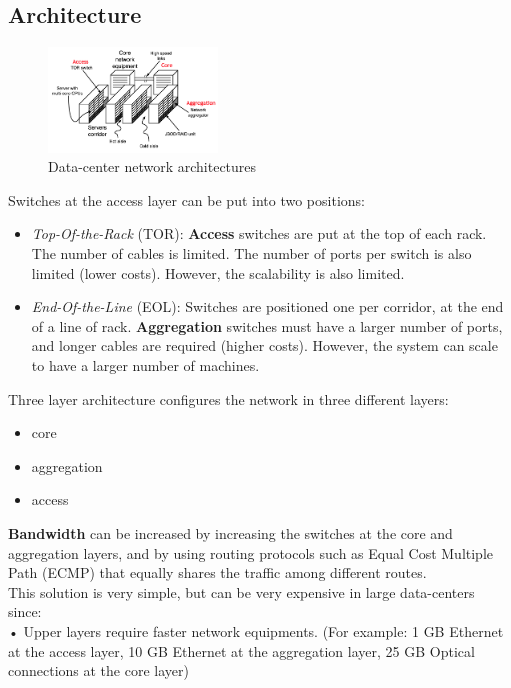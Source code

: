 \documentclass[10pt, oneside]{article}
\begin{document}
\subsection{Architecture}
\begin{figure}[H]
    \begin{center}
    \includegraphics[width=0.4\textwidth]{img/img22.png}
    \caption{Data-center network architectures}
    \label{fig:DS net architecture}
    \end{center}
\end{figure}
Switches at the access layer can be put into two positions:
\begin{itemize}
    \item {\sl Top-Of-the-Rack} (TOR): {\bf Access} switches are put at the top of each rack. The number of cables is limited. The number of ports per switch is also limited (lower costs). However, the scalability is also limited.
    \item {\sl End-Of-the-Line} (EOL): Switches are positioned one per corridor, at the end of a line of rack. {\bf Aggregation} switches must have a larger number of ports, and longer cables are required (higher costs). However, the system can scale to have a larger number of machines.
\end{itemize}
Three layer architecture configures the network in three different
layers:
\begin{itemize}
    \item core
    \item aggregation
    \item access
\end{itemize}
{\bf Bandwidth} can be increased by increasing the switches at the core and aggregation layers, and by using routing protocols such as Equal Cost Multiple Path (ECMP) that equally shares the traffic among different routes.\\
\newline
This solution is very simple, but can be very expensive in large data-centers since:\\
• Upper layers require faster network equipments. (For example: 1 GB Ethernet at the access layer, 10 GB Ethernet at the aggregation layer, 25 GB Optical connections at the core layer)\\
\end{document}
